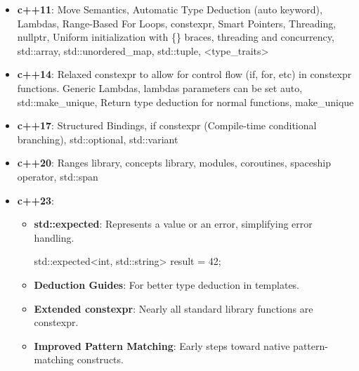 \documentclass{report}
\begin{document}
\pagebreak 
{}
\begin{itemize}
    \item \textbf{c++11}: Move Semantics, Automatic Type Deduction (auto keyword), Lambdas, Range-Based For Loops, constexpr, Smart Pointers, Threading, nullptr, Uniform initialization with \{\} braces, threading and concurrency, std::array, std::unordered\_map, std::tuple, <type\_traits>
    \item \textbf{c++14}: Relaxed constexpr to allow for control flow (if, for, etc) in constexpr functions. Generic Lambdas, lambdas parameters can be set auto, std::make\_unique, Return type deduction for normal functions, make\_unique
    \item \textbf{c++17}: Structured Bindings, if constexpr (Compile-time conditional branching), std::optional, std::variant
    \item \textbf{c++20}: Ranges library, concepts library, modules, coroutines, spaceship operator, std::span
    \item \textbf{c++23}: 
        \begin{itemize}
            \item \textbf{std::expected}: Represents a value or an error, simplifying error handling.
                \bigbreak \noindent 
                \begin{cppcode}
                std::expected<int, std::string> result = 42;
                \end{cppcode}
            \item \textbf{Deduction Guides}: For better type deduction in templates.
            \item \textbf{Extended constexpr}: Nearly all standard library functions are constexpr.
            \item \textbf{Improved Pattern Matching}: Early steps toward native pattern-matching constructs.
        \end{itemize}
\end{itemize}

























    
\end{document}
